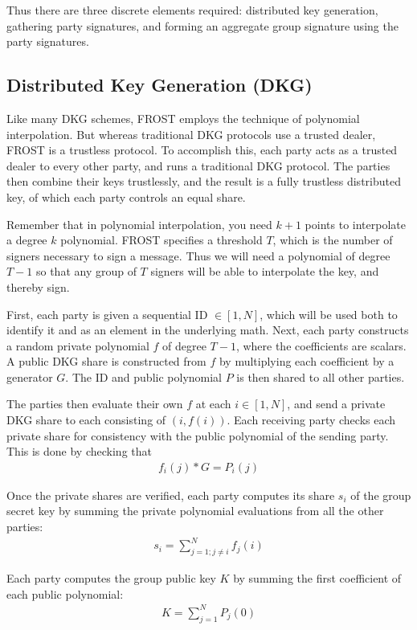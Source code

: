 \documentclass{article}
\begin{document}
Thus there are three discrete elements required: distributed key generation, gathering party signatures, and forming an aggregate group signature using the party signatures.

\subsection{
  Distributed Key Generation (DKG)
}

Like many DKG schemes, FROST employs the technique of polynomial interpolation.  But whereas traditional DKG protocols use a trusted dealer, FROST is a trustless protocol.  To accomplish this, each party acts as a trusted dealer to every other party, and runs a traditional DKG protocol.  The parties then combine their keys trustlessly, and the result is a fully trustless distributed key, of which each party controls an equal share.

Remember that in polynomial interpolation, you need $k+1$ points to interpolate a degree $k$ polynomial.  FROST specifies a threshold $T$, which is the number of signers necessary to sign a message.  Thus we will need a polynomial of degree $T-1$ so that any group of $T$ signers will be able to interpolate the key, and thereby sign.

First, each party is given a sequential ID $\in [1, N]$, which will be used both to identify it and as an element in the underlying math.  Next, each party constructs a random private polynomial $f$ of degree $T-1$, where the coefficients are scalars.  A public DKG share is constructed from $f$ by multiplying each coefficient by a generator $G$.  The ID and public polynomial $P$ is then shared to all other parties.

The parties then evaluate their own $f$ at each $i \in [1,N]$, and send a private DKG share to each consisting of $(i, f(i))$.  Each receiving party checks each private share for consistency with the public polynomial of the sending party.  This is done by checking that
\begin{align}
  f_i(j) * G = P_i(j)
\end{align}

Once the private shares are verified, each party computes its share $s_i$ of the group secret key by summing the private polynomial evaluations from all the other parties:
\begin{align}
  s_i = \sum_{j=1; j \neq i}^{N} f_j(i)
\end{align}

Each party computes the group public key $K$ by summing the first coefficient of each public polynomial:
\begin{align}
  K = \sum_{j=1}^{N} P_j(0)
\end{align}
\end{document}
